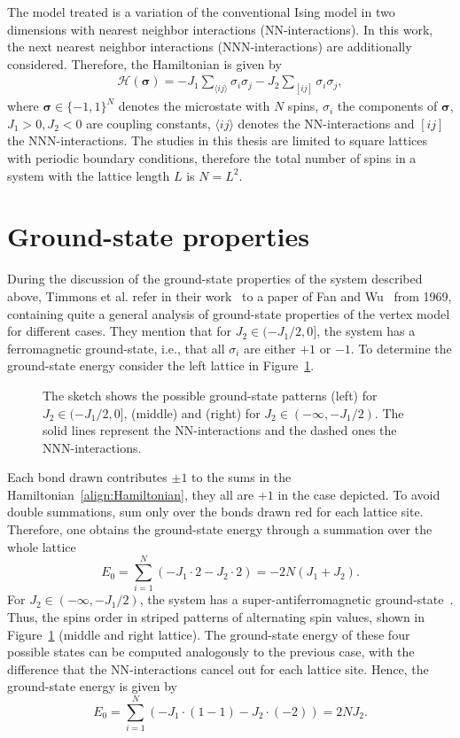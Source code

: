 \label{cha:physics}


The model treated is a variation of the conventional Ising model in two dimensions with nearest neighbor interactions 
(NN-interactions). In this work, the next nearest neighbor interactions (NNN-interactions) are additionally considered. 
Therefore, the Hamiltonian is given by 
\begin{align}
    \mathcal{H}(\bm{\sigma})=-J_1\sum_{\langle ij \rangle}\sigma_i\sigma_j-J_2\sum_{[ij]}\sigma_i\sigma_j,
    \label{align:Hamiltonian}
\end{align}
where $\bm{\sigma}\!\in\!\{-\!1,1\}^N$ denotes the microstate with $N$ spins, $\sigma_i$ the components of $\bm{\sigma}$, 
$J_1\!>\!0,J_2\!<\!0$ are coupling constants, $\langle ij \rangle$ denotes the NN-interactions and $[ij]$ the NNN-interactions. The 
studies in this thesis are limited to square lattices with periodic boundary conditions, therefore the total number of spins in a system with 
the lattice length $L$ is $N\!=\!L^2$. 


\section{Ground-state properties}
\label{sec:GroundState}

During the discussion of the ground-state properties of the system described above, Timmons et al. refer in their work~\cite{Timmons2018} to a paper 
of Fan and Wu~\cite{Fan1970} from 1969, containing quite a general analysis of ground-state properties of the vertex model for different 
cases. They mention that for $J_2\in(-\!J_1/2,0]$, the system has a ferromagnetic ground-state, i.e., that all $\sigma_i$ are  either $+\!1$ or $-\!1$. 
To determine the ground-state energy consider the left lattice in Figure~\ref{fig:system1}. 
\begin{figure}[!h]
    \centering
        
    \caption{ 
                The sketch shows the possible ground-state patterns (left) for $J_2\in(-\!J_1/2,0]$, (middle) and (right) for 
                $J_2\in(-\!\infty,-\!J_1/2)$. The solid lines represent the NN-interactions and the dashed ones the 
                NNN-interactions. 
            }
    \label{fig:system1}
\end{figure}
Each bond drawn contributes $\pm1$ to the sums in the Hamiltonian~\eqref{align:Hamiltonian}, they all are $+\!1$ in the case depicted. To avoid double
summations, sum only over the bonds drawn red for each lattice site. Therefore, one obtains the ground-state energy through a 
summation over the whole lattice $$E_0=\sum_{i=1}^{N}\left( -J_1\cdot2-J_2\cdot2 \right)=-2N(J_1+J_2).$$
For $J_2\in(-\!\infty,-\!J_1/2)$, the system has a super-antiferromagnetic ground-state~\cite{Timmons2018}. Thus, the spins order in
striped patterns of alternating spin values, shown in Figure~\ref{fig:system1} (middle and right lattice). The ground-state energy 
of these four possible states can be computed analogously to the previous case, with the difference that the NN-interactions cancel out for 
each lattice site. Hence, the ground-state energy is given by $$E_0=\sum_{i=1}^{N}\left( -J_1\cdot(1-1)-J_2\cdot(-2) \right)=2NJ_2.$$

